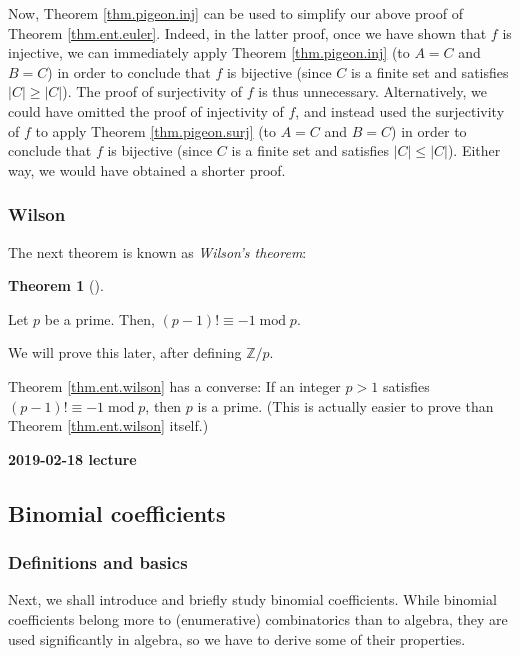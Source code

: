 \documentclass[numbers=enddot,12pt,final,onecolumn,notitlepage]{scrartcl}%
\numberwithin{exer}{subsection}
\theoremstyle{definition}
\newtheorem{theo}{Theorem}[subsection]
\newenvironment{theorem}[1][]
{\begin{theo}[#1]\begin{leftbar}}
{\end{leftbar}\end{theo}}
\begin{document}
Now, Theorem \ref{thm.pigeon.inj} can be used to simplify our above proof of
Theorem \ref{thm.ent.euler}. Indeed, in the latter proof, once we have shown
that $f$ is injective, we can immediately apply Theorem \ref{thm.pigeon.inj}
(to $A=C$ and $B=C$) in order to conclude that $f$ is bijective (since $C$ is
a finite set and satisfies $\left\vert C\right\vert \geq\left\vert
C\right\vert $). The proof of surjectivity of $f$ is thus unnecessary.
Alternatively, we could have omitted the proof of injectivity of $f$, and
instead used the surjectivity of $f$ to apply Theorem \ref{thm.pigeon.surj}
(to $A=C$ and $B=C$) in order to conclude that $f$ is bijective (since $C$ is
a finite set and satisfies $\left\vert C\right\vert \leq\left\vert
C\right\vert $). Either way, we would have obtained a shorter proof.

\subsubsection{Wilson}

The next theorem is known as \textit{Wilson's theorem}:

\begin{theorem}
\label{thm.ent.wilson}Let $p$ be a prime. Then, $\left(  p-1\right)
!\equiv-1\operatorname{mod}p$.
\end{theorem}

We will prove this later, after defining $\mathbb{Z}/p$.

Theorem \ref{thm.ent.wilson} has a converse: If an integer $p>1$ satisfies
$\left(  p-1\right)  !\equiv-1\operatorname{mod}p$, then $p$ is a prime. (This
is actually easier to prove than Theorem \ref{thm.ent.wilson} itself.)

\begin{center}
\textbf{2019-02-18 lecture}
\end{center}

\subsection{Binomial coefficients}

\subsubsection{Definitions and basics}

Next, we shall introduce and briefly study binomial coefficients. While
binomial coefficients belong more to (enumerative) combinatorics than to
algebra, they are used significantly in algebra, so we have to derive some of
their properties.
\end{document}
